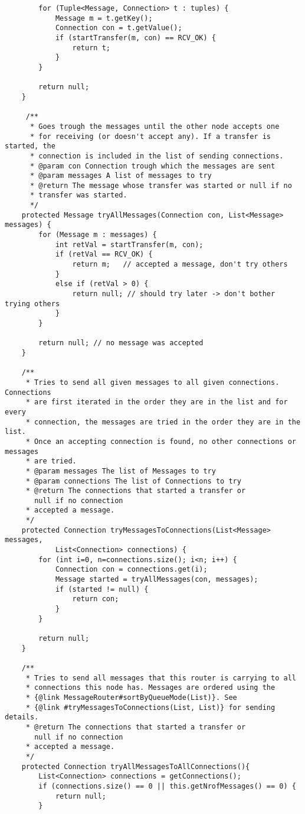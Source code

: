 \documentclass[11pt]{icsthesis}
\begin{document}
\begin{framed}
\begin{verbatim}
		for (Tuple<Message, Connection> t : tuples) {
			Message m = t.getKey();
			Connection con = t.getValue();
			if (startTransfer(m, con) == RCV_OK) {
				return t;
			}
		}
		
		return null;
	}
	
	 /**
	  * Goes trough the messages until the other node accepts one
	  * for receiving (or doesn't accept any). If a transfer is started, the
	  * connection is included in the list of sending connections.
	  * @param con Connection trough which the messages are sent
	  * @param messages A list of messages to try
	  * @return The message whose transfer was started or null if no 
	  * transfer was started. 
	  */
	protected Message tryAllMessages(Connection con, List<Message> messages) {
		for (Message m : messages) {
			int retVal = startTransfer(m, con); 
			if (retVal == RCV_OK) {
				return m;	// accepted a message, don't try others
			}
			else if (retVal > 0) { 
				return null; // should try later -> don't bother trying others
			}
		}
		
		return null; // no message was accepted		
	}

	/**
	 * Tries to send all given messages to all given connections. Connections
	 * are first iterated in the order they are in the list and for every
	 * connection, the messages are tried in the order they are in the list.
	 * Once an accepting connection is found, no other connections or messages
	 * are tried.
	 * @param messages The list of Messages to try
	 * @param connections The list of Connections to try
	 * @return The connections that started a transfer or 
       null if no connection
	 * accepted a message.
	 */
	protected Connection tryMessagesToConnections(List<Message> messages,
			List<Connection> connections) {
		for (int i=0, n=connections.size(); i<n; i++) {
			Connection con = connections.get(i);
			Message started = tryAllMessages(con, messages); 
			if (started != null) { 
				return con;
			}
		}
		
		return null;
	}
	
	/**
	 * Tries to send all messages that this router is carrying to all
	 * connections this node has. Messages are ordered using the 
	 * {@link MessageRouter#sortByQueueMode(List)}. See 
	 * {@link #tryMessagesToConnections(List, List)} for sending details.
	 * @return The connections that started a transfer or 
       null if no connection
	 * accepted a message.
	 */
	protected Connection tryAllMessagesToAllConnections(){
		List<Connection> connections = getConnections();
		if (connections.size() == 0 || this.getNrofMessages() == 0) {
			return null;
		}


\end{verbatim}
\end{framed}
\end{document}
